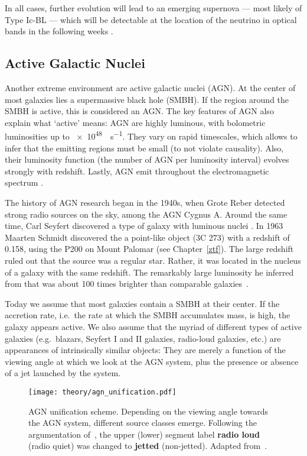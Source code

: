 In all cases, further evolution will lead to an emerging supernova --- most likely of Type Ic-BL --- which will be detectable at the location of the neutrino in optical bands in the following weeks .

\subsection{Active Galactic Nuclei}\label{agn}
Another extreme environment are active galactic nuclei (AGN). At the center of most galaxies lies a supermassive black hole (SMBH). If the region around the SMBH is active, this is considered an AGN\@. The key features of AGN also explain what `active' means: AGN are highly luminous, with bolometric luminosities up to \SI{e48}{\erg\per\s}. They vary on rapid timescales, which allows to infer that the emitting regions must be small (to not violate causality). Also, their luminosity function (the number of AGN per luminosity interval) evolves strongly with redshift. Lastly, AGN emit throughout the electromagnetic spectrum .

The history of AGN research began in the 1940s, when Grote Reber detected strong radio sources on the sky, among the AGN Cygnus A. Around the same time, Carl Seyfert discovered a type of galaxy with luminous nuclei . In 1963 Maarten Schmidt discovered the a point-like object (3C 273) with a redshift of 0.158, using the P200 on Mount Palomar (see Chapter~\ref{ztf}). The large redshift ruled out that the source was a regular star. Rather, it was located in the nucleus of a galaxy with the same redshift. The remarkably large luminosity he inferred from that was about 100 times brighter than comparable galaxies~.

Today we assume that most galaxies contain a SMBH at their center. If the accretion rate, i.e.\ the rate at which the SMBH accumulates mass, is high, the galaxy appears active. We also assume that the myriad of different types of active galaxies (e.g.\ blazars, Seyfert I and II galaxies, radio-loud galaxies, etc.) are appearances of intrinsically similar objects: They are merely a function of the viewing angle at which we look at the AGN system, plus the presence or absence of a jet launched by the system.

\begin{figure}[htb]
    \texttt{[image: theory/agn\_unification.pdf]}
    \caption[AGN]{AGN unification scheme. Depending on the viewing angle towards the AGN system, different source classes emerge. Following the argumentation of~\cite{Padovani2017}, the upper (lower) segment label \textbf{radio loud} (radio quiet) was changed to \textbf{jetted} (non-jetted). Adapted from~\cite{Thorne2022}.}
\end{figure}

